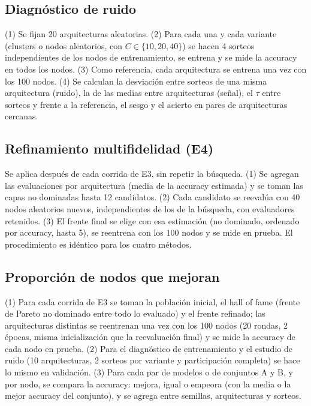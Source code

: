 \documentclass[11pt,a4paper]{article}
\begin{document}
\subsection*{Diagnóstico de ruido}
(1) Se fijan 20 arquitecturas aleatorias. (2) Para cada una y cada variante (clusters o nodos aleatorios, con $C\in\{10,20,40\}$) se hacen 4 sorteos independientes de los nodos de entrenamiento, se entrena y se mide la accuracy en todos los nodos. (3) Como referencia, cada arquitectura se entrena una vez con los 100 nodos. (4) Se calculan la desviación entre sorteos de una misma arquitectura (ruido), la de las medias entre arquitecturas (señal), el $\tau$ entre sorteos y frente a la referencia, el sesgo y el acierto en pares de arquitecturas cercanas.

\subsection*{Refinamiento multifidelidad (E4)}
Se aplica después de cada corrida de E3, sin repetir la búsqueda. (1) Se agregan las evaluaciones por arquitectura (media de la accuracy estimada) y se toman las capas no dominadas hasta 12 candidatos. (2) Cada candidato se reevalúa con 40 nodos aleatorios nuevos, independientes de los de la búsqueda, con evaluadores retenidos. (3) El frente final se elige con esa estimación (no dominado, ordenado por accuracy, hasta 5), se reentrena con los 100 nodos y se mide en prueba. El procedimiento es idéntico para los cuatro métodos.

\subsection*{Proporción de nodos que mejoran}
(1) Para cada corrida de E3 se toman la población inicial, el hall of fame (frente de Pareto no dominado entre todo lo evaluado) y el frente refinado; las arquitecturas distintas se reentrenan una vez con los 100 nodos (20 rondas, 2 épocas, misma inicialización que la reevaluación final) y se mide la accuracy de cada nodo en prueba. (2) Para el diagnóstico de entrenamiento y el estudio de ruido (10 arquitecturas, 2 sorteos por variante y participación completa) se hace lo mismo en validación. (3) Para cada par de modelos o de conjuntos A y B, y por nodo, se compara la accuracy: mejora, igual o empeora (con la media o la mejor accuracy del conjunto), y se agrega entre semillas, arquitecturas y sorteos.
\end{document}
